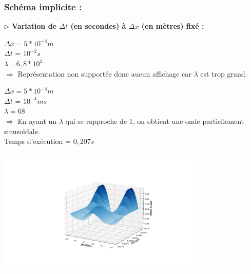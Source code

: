 

\subsubsection{Schéma implicite :}

$\triangleright$ \textbf{Variation de $\Delta t$ (en secondes) à $\Delta x$ (en mètres) fixé :}\\
\begin{enumerate}[label=\alph*)]


\begin{minipage}{.5\textwidth}%

\item $\Delta x =  5*{10}^{-4}m$\\
$\Delta t$ = ${10}^{-2} s $\\
$\lambda$ =$6,8*{10}^{3}$\\

$\Longrightarrow$ Représentation non supportée donc aucun affichage car $\lambda$ est trop grand.\\ 

\end{minipage}%




\begin{minipage}{.5\textwidth}%
\item $\Delta x = 5*{10}^{-4}m $\\
$\Delta t$ = ${10}^{-4}m s $ \\
$\lambda =68$ \\

$\Longrightarrow$ En ayant un $\lambda$ qui se rapproche de 1, on obtient une onde partiellement sinusoïdale.\\
Temps d'exécution = $0,207s$

\end{minipage}%
\hfill
\begin{minipage}{.45\textwidth}%
\includegraphics[width=10cm,height=6cm]{implicitec.png}
\end{minipage}%


\end{enumerate}
